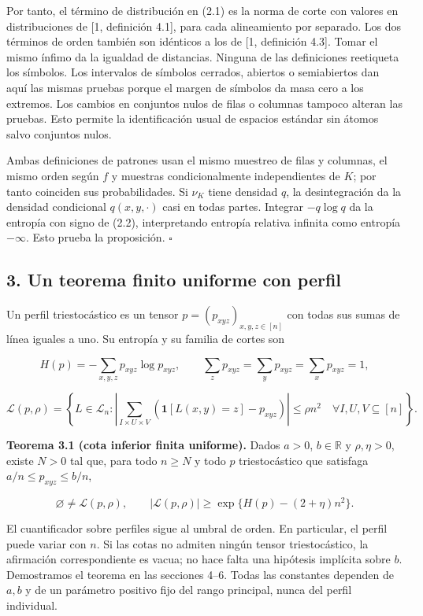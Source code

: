 \documentclass[spanish,11pt,a4paper]{article}
\begin{document}
Por tanto, el término de distribución en (2.1) es la norma de corte con valores en distribuciones de {[}1, definición 4.1{]}, para cada alineamiento por separado. Los dos términos de orden también son idénticos a los de {[}1, definición 4.3{]}. Tomar el mismo ínfimo da la igualdad de distancias. Ninguna de las definiciones reetiqueta los símbolos. Los intervalos de símbolos cerrados, abiertos o semiabiertos dan aquí las mismas pruebas porque el margen de símbolos da masa cero a los extremos. Los cambios en conjuntos nulos de filas o columnas tampoco alteran las pruebas. Esto permite la identificación usual de espacios estándar sin átomos salvo conjuntos nulos.

Ambas definiciones de patrones usan el mismo muestreo de filas y columnas, el mismo orden según \(f\) y muestras condicionalmente independientes de \(K\); por tanto coinciden sus probabilidades. Si \(\nu_K\) tiene densidad \(q\), la desintegración da la densidad condicional \(q(x,y,\cdot)\) casi en todas partes. Integrar \(-q\log q\) da la entropía con signo de (2.2), interpretando entropía relativa infinita como entropía \(-\infty\). Esto prueba la proposición. \(\square\)

\subsection{3. Un teorema finito uniforme con perfil}\label{un-teorema-finito-uniforme-con-perfil}

Un perfil triestocástico es un tensor \(p=(p_{xyz})_{x,y,z\in[n]}\) con todas sus sumas de línea iguales a uno. Su entropía y su familia de cortes son

\nopagebreak[4]
\[H(p)=-\sum_{x,y,z}p_{xyz}\log p_{xyz},\qquad
\sum_zp_{xyz}=\sum_yp_{xyz}=\sum_xp_{xyz}=1,\tag{3.1}\]

\nopagebreak[4]
\[\mathcal L(p,\rho)=\left\{L\in\mathcal L_n:
\left|\sum_{I\times U\times V}(\mathbf1[L(x,y)=z]-p_{xyz})\right|\le\rho n^2
\quad\forall I,U,V\subseteq[n]\right\}.\tag{3.2}\]

\textbf{Teorema 3.1 (cota inferior finita uniforme).} Dados \(a>0\), \(b\in\mathbb R\) y \(\rho,\eta>0\), existe \(N>0\) tal que, para todo \(n\ge N\) y todo \(p\) triestocástico que satisfaga \(a/n\le p_{xyz}\le b/n\),

\nopagebreak[4]
\[\varnothing\ne\mathcal L(p,\rho),\qquad |\mathcal L(p,\rho)|\ge\exp\{H(p)-(2+\eta)n^2\}.\tag{3.3}\]

El cuantificador sobre perfiles sigue al umbral de orden. En particular, el perfil puede variar con \(n\). Si las cotas no admiten ningún tensor triestocástico, la afirmación correspondiente es vacua; no hace falta una hipótesis implícita sobre \(b\). Demostramos el teorema en las secciones 4--6. Todas las constantes dependen de \(a,b\) y de un parámetro positivo fijo del rango principal, nunca del perfil individual.
\end{document}
